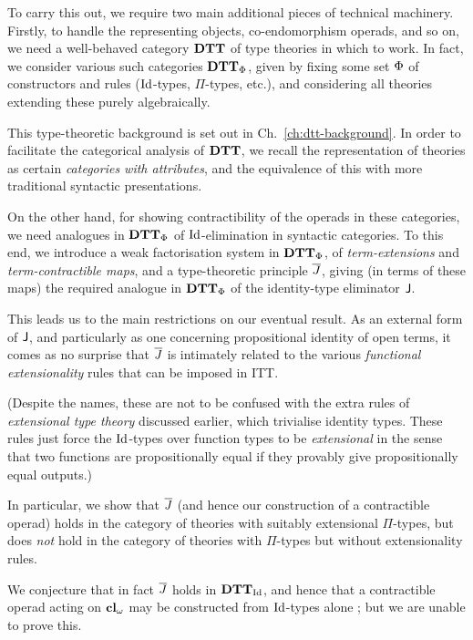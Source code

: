 \begin{para}
To carry this out, we require two main additional pieces of technical machinery.  Firstly, to handle the representing objects, co-endomorphism operads, and so on, we need a well-behaved category $\mathbf{DTT}$ of type theories in which to work.  In fact, we consider various such categories $\mathbf{DTT}_{\Phi}$, given by fixing some set ${\Phi}$ of constructors and rules ($\mathrm{Id}$-types, $\Pi$-types, etc.), and considering all theories extending these purely algebraically.

This type-theoretic background is set out in Ch.~\ref{ch:dtt-background}.  In order to facilitate the categorical analysis of $\mathbf{DTT}$, we recall the representation of theories as certain \emph{categories with attributes}, and the equivalence of this with more traditional syntactic presentations.

On the other hand, for showing contractibility of the operads in these categories, we need analogues in $\mathbf{DTT}_{\Phi}$ of $\mathrm{Id}$-elimination in syntactic categories.  To this end, we introduce a weak factorisation system in $\mathbf{DTT}_{\Phi}$, of \emph{term-extensions} and \emph{term-contractible maps}, and a type-theoretic principle $\overline{J}$, giving (in terms of these maps) the required analogue in $\mathbf{DTT}_{\Phi}$ of the identity-type eliminator $\mathsf{J}$.
\end{para}

\begin{para}
This leads us to the main restrictions on our eventual result.  As an external form of $\mathsf{J}$, and particularly as one concerning propositional identity of open terms, it comes as no surprise that $\overline{J}$ is intimately related to the various \emph{functional extensionality} rules that can be imposed in ITT.

(Despite the names, these are not to be confused with the extra rules of \emph{extensional type theory} discussed earlier, which trivialise identity types.  These rules just force the $\mathrm{Id}$-types over function types to be \emph{extensional} in the sense that two functions are propositionally equal if they provably give propositionally equal outputs.)

In particular, we show that $\overline{J}$ (and hence our construction of a contractible operad) holds in the category of theories with suitably extensional $\Pi$-types, but does \emph{not} hold in the category of theories with $\Pi$-types but without extensionality rules.  

We conjecture that in fact $\overline{J}$ holds in $\mathbf{DTT}_{\mathrm{Id}}$, and hence that a contractible operad acting on $\mathbf{cl}_\omega$ may be constructed from $\mathrm{Id}$-types alone ; but we are unable to prove this.
\end{para}

